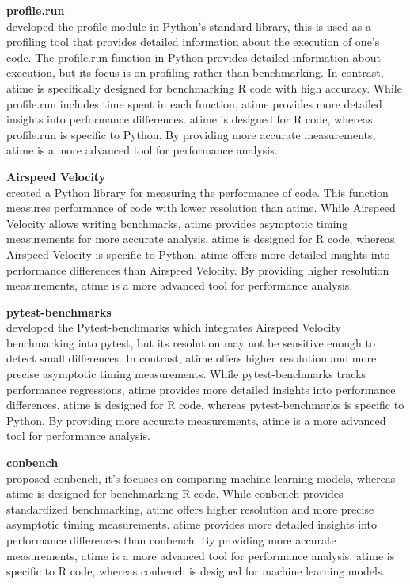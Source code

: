 \textbf{profile.run} \\
\citet{profile} developed the profile module in Python's standard library, this is used as a profiling tool that provides detailed information about the execution of one's code. The profile.run function in Python provides detailed information about execution, but its focus is on profiling rather than benchmarking. In contrast, atime is specifically designed for benchmarking R code with high accuracy. While profile.run includes time spent in each function, atime provides more detailed insights into performance differences. atime is designed for R code, whereas profile.run is specific to Python. By providing more accurate measurements, atime is a more advanced tool for performance analysis.
\vspace{0.1in}

\textbf{Airspeed Velocity} \\
\citet{airspeed_velocity} created a Python library for measuring the performance of code. This function measures performance of code with lower resolution than atime. While Airspeed Velocity allows writing benchmarks, atime provides asymptotic timing measurements for more accurate analysis. atime is designed for R code, whereas Airspeed Velocity is specific to Python. atime offers more detailed insights into performance differences than Airspeed Velocity. By providing higher resolution measurements, atime is a more advanced tool for performance analysis.
\vspace{0.1in}

\textbf{pytest-benchmarks} \\
\citet{pytest_benchmark} developed the Pytest-benchmarks which integrates Airspeed Velocity benchmarking into pytest, but its resolution may not be sensitive enough to detect small differences. In contrast, atime offers higher resolution and more precise asymptotic timing measurements. While pytest-benchmarks tracks performance regressions, atime provides more detailed insights into performance differences. atime is designed for R code, whereas pytest-benchmarks is specific to Python. By providing more accurate measurements, atime is a more advanced tool for performance analysis.
\vspace{0.1in}

\textbf{conbench} \\
\citet{conbench} proposed conbench, it's focuses on comparing machine learning models, whereas atime is designed for benchmarking R code. While conbench provides standardized benchmarking, atime offers higher resolution and more precise asymptotic timing measurements. atime provides more detailed insights into performance differences than conbench. By providing more accurate measurements, atime is a more advanced tool for performance analysis. atime is specific to R code, whereas conbench is designed for machine learning models.
\vspace{0.1in}

